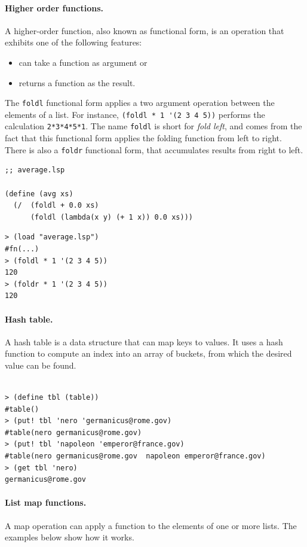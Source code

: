 \documentclass[a4paper,12pt]{book}
\newenvironment{fmpage}[1]
           {\begin{lrbox}{\fmbox}\begin{minipage}{#1}}
           {\end{minipage}\end{lrbox}\fbox{\usebox{\fmbox}}}
\begin{document}
\paragraph{Higher order functions.}
A higher-order function, also known as
functional form, is an operation that
exhibits one of the following features:
\begin{itemize}
  \item can take a function as argument or
  \item returns a function as the result.
\end{itemize}

The \verb|foldl| functional form applies
a two argument operation between the
elements of a list. For instance,
\verb|(foldl * 1 '(2 3 4 5))| performs
the calculation \verb|2*3*4*5*1|.
The name \verb|foldl| is short for
{\em fold left}, and comes from the
fact that this functional form applies
the folding function from left to right.
There is also a \verb|foldr| functional
form, that accumulates results from
 right to left.\\
 
\begin{fmpage}{0.9\textwidth}
\begin{verbatim}
;; average.lsp

(define (avg xs)
  (/  (foldl + 0.0 xs)
      (foldl (lambda(x y) (+ 1 x)) 0.0 xs)))
\end{verbatim}
\end{fmpage}
\begin{verbatim}
> (load "average.lsp")
#fn(...)
> (foldl * 1 '(2 3 4 5))
120
> (foldr * 1 '(2 3 4 5))
120
\end{verbatim}

\paragraph{Hash table.}
A hash table is a data structure that can map keys to values. 
It uses a hash function to compute an index 
into an array of buckets, from which the desired
value can be found.
\begin{verbatim}

> (define tbl (table))
#table()
> (put! tbl 'nero 'germanicus@rome.gov)
#table(nero germanicus@rome.gov)
> (put! tbl 'napoleon 'emperor@france.gov)
#table(nero germanicus@rome.gov  napoleon emperor@france.gov)
> (get tbl 'nero)
germanicus@rome.gov
\end{verbatim}

\paragraph{List map functions.} A map operation can
apply a function to the elements of one or more lists.
The examples below show how it works.
\end{document}
